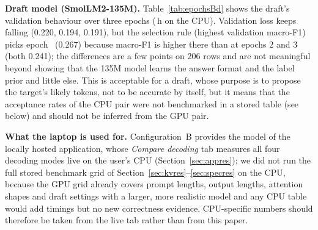 \textbf{Draft model (SmolLM2-135M).} Table~\ref{tab:epochsBd} shows the draft's validation behaviour over three epochs (\DTrainHours{}\,h on the CPU). Validation loss keeps falling (0.220, 0.194, 0.191), but the selection rule (highest validation macro-F1) picks epoch~\DBestEpoch{} (0.267) because macro-F1 is higher there than at epochs 2 and 3 (both 0.241); the differences are a few points on 206 rows and are not meaningful beyond showing that the 135M model learns the answer format and the label prior and little else. This is acceptable for a draft, whose purpose is to propose the target's likely tokens, not to be accurate by itself, but it means that the acceptance rates of the CPU pair were not benchmarked in a stored table (see below) and should not be inferred from the GPU pair.

\textbf{What the laptop is used for.} Configuration~B provides the model of the locally hosted application, whose \emph{Compare decoding} tab measures all four decoding modes live on the user's CPU (Section~\ref{sec:appres}); we did not run the full stored benchmark grid of Section~\ref{sec:kvres}--\ref{sec:specres} on the CPU, because the GPU grid already covers prompt lengths, output lengths, attention shapes and draft settings with a larger, more realistic model and any CPU table would add timings but no new correctness evidence. CPU-specific numbers should therefore be taken from the live tab rather than from this paper.

\begin{table}[t]\centering\caption{Config.~B draft (SmolLM2-135M + LoRA, CPU): validation after each epoch ($^*$ = selected).}\label{tab:epochsBd}
\small\end{table}
